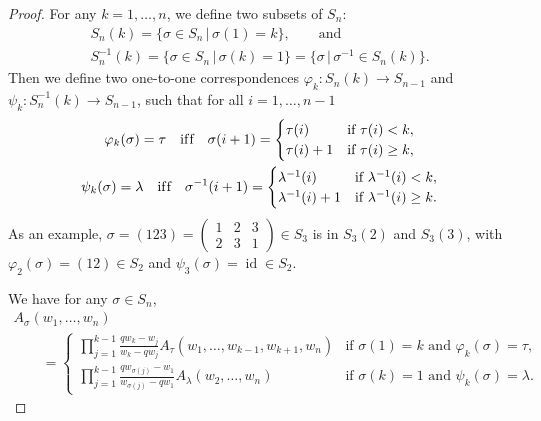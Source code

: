\documentclass[11pt]{article}
\numberwithin{equation}{section}
\DeclareMathOperator{\id}{id}
\begin{document}
\begin{proof}
 For any $k = 1, \dotsc, n$, we def\/ine two subsets of $S_n$:
 \begin{gather}
 S_n(k) = \{ \sigma \in S_n \,|\, \sigma(1) = k \}, \qquad \text{and} \nonumber\\
  S^{-1}_n(k) = \{ \sigma \in S_n \,|\, \sigma(k) = 1 \} = \big\{ \sigma \,|\, \sigma^{-1} \in S_n(k) \big\}.\label{eq:defn_S_n(k)}
 \end{gather}
 Then we def\/ine two one-to-one correspondences $\varphi_k\colon S_n(k) \to S_{n - 1}$ and $\psi_k\colon S^{-1}_n(k) \to S_{n - 1}$, such that
for all $i = 1, \dotsc, n - 1$
 \begin{gather}
 \varphi_k(\sigma) =   \tau \quad \text{if\/f} \quad \sigma(i + 1) =
 \begin{cases}
 \tau(i) & \text{if $\tau(i) < k$}, \\
 \tau(i) + 1 & \text{if $\tau(i) \geq k$},
 \end{cases} \nonumber\\
 \psi_k(\sigma) =   \lambda \quad \text{if\/f} \quad \sigma^{-1}(i + 1) =
 \begin{cases}
 \lambda^{-1}(i) & \text{if $\lambda^{-1}(i) < k$}, \\
 \lambda^{-1}(i) + 1 & \text{if $\lambda^{-1}(i) \geq k$}.
 \end{cases}
\label{eq:defn_varphi_k_and_psi_k}
 \end{gather}
 As an example, $\sigma = (123) = \left(
 \begin{smallmatrix}
 1 & 2 & 3 \\
 2 & 3 & 1
 \end{smallmatrix}
 \right) \in S_3$ is in $S_3(2)$ and $S_3(3)$, with $\varphi_2(\sigma) = (12) \in S_2$ and $\psi_3(\sigma) = \id \in S_2$.


 We have for any $\sigma \in S_n$,
\begin{gather}
 A_{\sigma}(w_1, \dotsc, w_n) \nonumber\\
\qquad{} =
 \begin{cases}
 \displaystyle \prod^{k - 1}_{j = 1} \frac{q w_k - w_j}{w_k - q w_j} A_{\tau}(w_1, \dotsc, w_{ k - 1}, w_{k + 1}, w_n) & \text{if $\sigma(1) = k$ and $\varphi_k(\sigma) = \tau$}, \\
 \displaystyle \prod^{k - 1}_{j = 1} \frac{q w_{\sigma(j)} - w_1}{w_{\sigma(j)} - q w_1} A_{\lambda}(w_2, \dotsc, w_n) & \text{if $\sigma(k) = 1$ and $\psi_k(\sigma) = \lambda$}.
 \end{cases}\label{eq:A_sigma_in_A_tau_A_lambda}
 \end{gather}


\end{proof}
\end{document}
